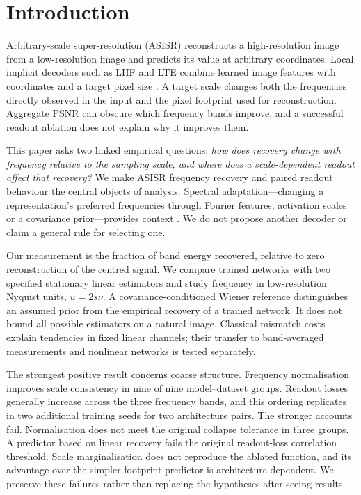 \section{Introduction}\label{sec:intro}
Arbitrary-scale super-resolution (ASISR) reconstructs a high-resolution image from a low-resolution image and predicts its value at arbitrary coordinates. Local implicit decoders such as LIIF and LTE combine learned image features with coordinates and a target pixel size \citep{chen2021liif,lee2022lte}. A target scale changes both the frequencies directly observed in the input and the pixel footprint used for reconstruction. Aggregate PSNR can obscure which frequency bands improve, and a successful readout ablation does not explain why it improves them.

This paper asks two linked empirical questions: \emph{how does recovery change with frequency relative to the sampling scale, and where does a scale-dependent readout affect that recovery?} We make ASISR frequency recovery and paired readout behaviour the central objects of analysis. Spectral adaptation---changing a representation's preferred frequencies through Fourier features, activation scales or a covariance prior---provides context \citep{tancik2020fourier,sitzmann2020siren,kania2025fresh}. We do not propose another decoder or claim a general rule for selecting one.

Our measurement is the fraction of band energy recovered, relative to zero reconstruction of the centred signal. We compare trained networks with two specified stationary linear estimators and study frequency in low-resolution Nyquist units, $u=2s\nu$. A covariance-conditioned Wiener reference distinguishes an assumed prior from the empirical recovery of a trained network. It does not bound all possible estimators on a natural image. Classical mismatch costs explain tendencies in fixed linear channels; their transfer to band-averaged measurements and nonlinear networks is tested separately.

The strongest positive result concerns coarse structure. Frequency normalisation improves scale consistency in nine of nine model--dataset groups. Readout losses generally increase across the three frequency bands, and this ordering replicates in two additional training seeds for two architecture pairs. The stronger accounts fail. Normalisation does not meet the original collapse tolerance in three groups. A predictor based on linear recovery fails the original readout-loss correlation threshold. Scale marginalisation does not reproduce the ablated function, and its advantage over the simpler footprint predictor is architecture-dependent. We preserve these failures rather than replacing the hypotheses after seeing results.

